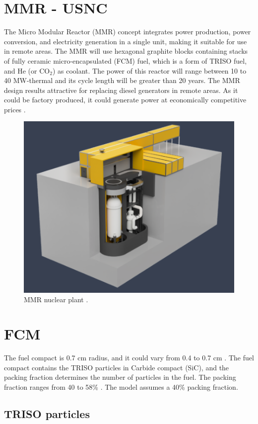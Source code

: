 \section{MMR - USNC}

The Micro Modular Reactor (MMR) concept integrates power production, power conversion, and electricity generation in a single unit, making it suitable for use in remote areas. 
The MMR will use hexagonal graphite blocks containing stacks of fully ceramic micro-encapsulated (FCM) fuel, which is a form of TRISO fuel, and He (or CO$_2$) as coolant.
The power of this reactor will range between 10 to 40 MW-thermal and its cycle length will be greater than 20 years.
The MMR design results attractive for replacing diesel generators in remote areas. As it could be factory produced, it could generate power at economically competitive prices \cite{hawari_development_2018}.

\begin{figure}[H]
	\centering
	\includegraphics[width=0.5\linewidth]{figures/mmr.png}
	\hfill
	\caption{MMR nuclear plant \cite{usnc_mmr_2019}.}
	\label{fig:triso}
\end{figure}

\section{FCM}

The fuel compact is 0.7 cm radius, and it could vary from 0.4 to 0.7 cm \cite{powers_fully_2013}. The fuel compact contains the TRISO particles in Carbide compact (SiC), and the packing fraction determines the number of particles in the fuel. The packing fraction ranges from 40 to 58\% \cite{powers_fully_2013}. The model assumes a 40\% packing fraction.

\subsection{TRISO particles}

